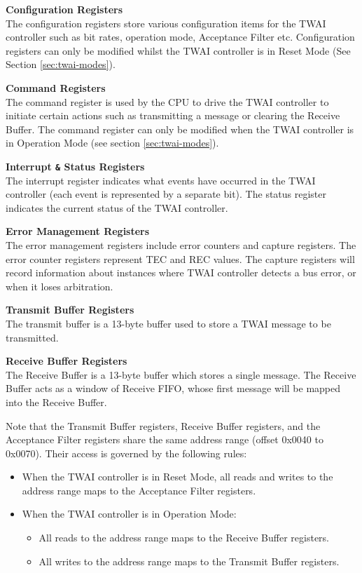 \documentclass[main\_\_EN.tex]{subfiles}
\begin{document}
{\bfseries Configuration Registers}\\
The configuration registers store various configuration items for the TWAI controller such as bit rates, operation mode, Acceptance Filter etc. Configuration registers can only be modified whilst the TWAI controller is in Reset Mode (See Section \ref{sec:twai-modes}).

{\bfseries Command Registers}\\
The command register is used by the CPU to drive the TWAI controller to initiate certain actions such as transmitting a message or clearing the Receive Buffer. The command register can only be modified when the TWAI controller is in Operation Mode (see section \ref{sec:twai-modes}).

{\bfseries Interrupt \verb+&+ Status Registers}\\
The interrupt register indicates what events have occurred in the TWAI controller (each event is represented by a separate bit). The status register indicates the current status of the TWAI controller.

{\bfseries Error Management Registers}\\
The error management registers include error counters and capture registers. The error counter registers represent TEC and REC values. The capture registers will record information about instances where TWAI controller detects a bus error, or when it loses arbitration.

{\bfseries Transmit Buffer Registers}\\
The transmit buffer is a 13-byte buffer used to store a TWAI message to be transmitted.

{\bfseries Receive Buffer Registers}\\
The Receive Buffer is a 13-byte buffer which stores a single message. The Receive Buffer acts as a window of Receive FIFO, whose first message will be mapped into the Receive Buffer.

Note that the Transmit Buffer registers, Receive Buffer registers, and the Acceptance Filter registers share the same address range (offset 0x{}0040 to 0x{}0070). Their access is governed by the following rules:

\begin{itemize}
    \item When the TWAI controller is in Reset Mode, all reads and writes to the address range maps to the Acceptance Filter registers.
    \item When the TWAI controller is in Operation Mode:
    \begin{itemize}
        \item All reads to the address range maps to the Receive Buffer registers.
        \item All writes to the address range maps to the Transmit Buffer registers.
    \end{itemize}
\end{itemize}
\end{document}
